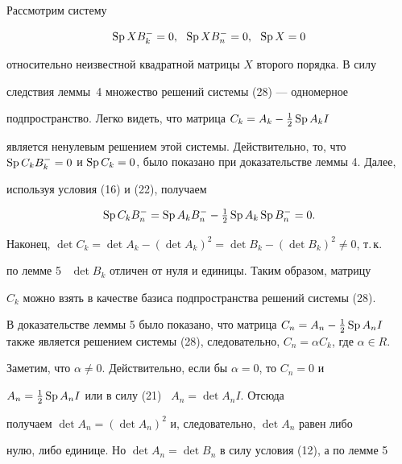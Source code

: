 \begin{pf} 


Рассмотрим систему 


\begin{equation} 


\Sp X B^-_k=0,\ \ \Sp X B^-_n=0,\ \ \Sp X=0 


\end{equation} 


относительно неизвестной квадратной матрицы $X$ второго порядка. В силу 


следствия леммы~4 множество решений системы (28) --- одномерное 


подпространство. Легко видеть, что матрица $C_k=A_k-\frac{1}{2}\operatorname{Sp} A_k I$ 


является ненулевым решением этой системы. Действительно, то, что $\Sp C_k 


B^-_k=0$ и $\Sp C_k=0$, было показано при доказательстве леммы 4. Далее, 


используя условия (16) и (22), получаем 


$$ 


\Sp C_k B^-_n=\Sp A_k B^-_n-\tfrac{1}{2}\Sp A_k\Sp B^-_n=0. 


$$ 


 


Наконец, $\det C_k=\det A_k-(\det A_k)^2=\det B_k-(\det B_k)^2\ne0$, т.\,к. 


по лемме 5 \ $\det B_k$ отличен от нуля и единицы. Таким образом, матрицу 


$C_k$ можно взять в качестве базиса подпространства решений системы (28). 


 


В доказательстве леммы 5 было показано, что матрица $C_n=A_n-\frac{1}{2}\Sp 


A_n I$ также является решением системы (28), следовательно, $C_n=\alpha 


C_k$, где $\alpha\in R$. 


 


Заметим, что $\alpha\ne0$. Действительно, если бы $\alpha=0$, то $C_n=0$ и 


$A_n=\frac{1}{2}\operatorname{Sp} A_n I$ или в силу (21) \ $A_n=\det A_n I$. Отсюда 


получаем $\det A_n=(\det A_n)^2$ и, следовательно, $\det A_n$ равен либо 


нулю, либо единице. Но $\det A_n=\det B_n$ в силу условия (12), а по лемме 5 



\end{pf}
